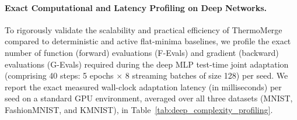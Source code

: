 \paragraph{Exact Computational and Latency Profiling on Deep Networks.} To rigorously validate the scalability and practical efficiency of ThermoMerge compared to deterministic and active flat-minima baselines, we profile the exact number of function (forward) evaluations (F-Evals) and gradient (backward) evaluations (G-Evals) required during the deep MLP test-time joint adaptation (comprising 40 steps: 5 epochs $\times$ 8 streaming batches of size 128) per seed.
We report the exact measured wall-clock adaptation latency (in milliseconds) per seed on a standard GPU environment, averaged over all three datasets (MNIST, FashionMNIST, and KMNIST), in Table~\ref{tab:deep_complexity_profiling}.

\begin{table}[tb]
\caption{\textbf{Computational Evaluation and Wall-clock Latency Profiling of Joint Test-Time Adaptation Methods on Deep Neural Networks.} We report the exact number of F-Evals and G-Evals, along with the average wall-clock latency (ms) per seed, for both standard (joint MLP) model merging and PEFT/LoRA model merging. All metrics are measured over 40 adaptation steps on a streaming multi-batch testbed.}
\label{tab:deep_complexity_profiling}
\vskip 0.15in
\begin{center}
\begin{small}
\begin{sc}
\end{sc}
\end{small}
\end{center}
\vskip -0.1in
\end{table}


